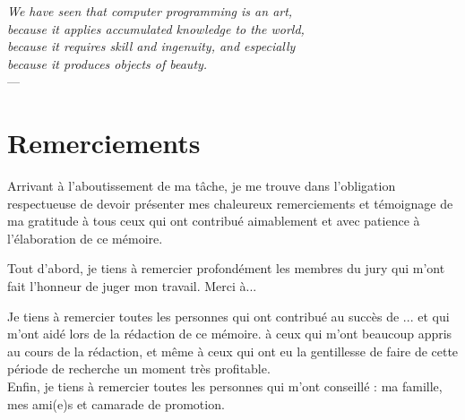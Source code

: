 

\begin{flushright}{\slshape    
We have seen that computer programming is an art, \\ 
because it applies accumulated knowledge to the world, \\ 
because it requires skill and ingenuity, and especially \\
because it produces objects of beauty.} \\ \medskip
---  \citep{knuth:1974}
\end{flushright}



\bigskip


\begingroup

\let\clearpage\relax
\let\cleardoublepage\relax
\let\cleardoublepage\relax
\chapter*{Remerciements}

Arrivant à l’aboutissement de ma tâche, je me trouve dans l’obligation respectueuse de devoir présenter mes chaleureux remerciements et témoignage de ma gratitude à tous ceux qui ont contribué aimablement et avec patience à l’élaboration de ce mémoire.

Tout d’abord, je tiens à remercier profondément les membres du jury qui m’ont fait l’honneur de juger mon travail. Merci à...

Je tiens à remercier toutes les personnes qui ont contribué au succès de ... et qui m'ont aidé lors de la rédaction de ce mémoire. à ceux qui m’ont beaucoup appris au cours de la rédaction, et même à ceux qui ont eu la gentillesse de faire de cette période de recherche un moment très profitable.\\

Enfin, je tiens à remercier toutes les personnes qui m'ont conseillé : ma famille, mes ami(e)s et camarade de promotion.

\endgroup